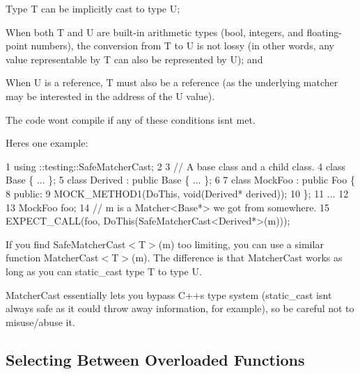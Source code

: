 \begin{DoxyEnumerate}
\item Type {\ttfamily T} can be implicitly cast to type {\ttfamily U};
\end{DoxyEnumerate}
\begin{DoxyEnumerate}
\item When both {\ttfamily T} and {\ttfamily U} are built-\/in arithmetic types ({\ttfamily bool}, integers, and floating-\/point numbers), the conversion from {\ttfamily T} to {\ttfamily U} is not lossy (in other words, any value representable by {\ttfamily T} can also be represented by {\ttfamily U}); and
\end{DoxyEnumerate}
\begin{DoxyEnumerate}
\item When {\ttfamily U} is a reference, {\ttfamily T} must also be a reference (as the underlying matcher may be interested in the address of the {\ttfamily U} value).
\end{DoxyEnumerate}

The code won\textquotesingle{}t compile if any of these conditions isn\textquotesingle{}t met.

Here\textquotesingle{}s one example\+:


\begin{DoxyCode}
1 using ::testing::SafeMatcherCast;
2 
3 // A base class and a child class.
4 class Base \{ ... \};
5 class Derived : public Base \{ ... \};
6 
7 class MockFoo : public Foo \{
8  public:
9   MOCK\_METHOD1(DoThis, void(Derived* derived));
10 \};
11 ...
12 
13   MockFoo foo;
14   // m is a Matcher<Base*> we got from somewhere.
15   EXPECT\_CALL(foo, DoThis(SafeMatcherCast<Derived*>(m)));
\end{DoxyCode}


If you find {\ttfamily Safe\+Matcher\+Cast$<$T$>$(m)} too limiting, you can use a similar function {\ttfamily Matcher\+Cast$<$T$>$(m)}. The difference is that {\ttfamily Matcher\+Cast} works as long as you can {\ttfamily static\+\_\+cast} type {\ttfamily T} to type {\ttfamily U}.

{\ttfamily Matcher\+Cast} essentially lets you bypass C++\textquotesingle{}s type system ({\ttfamily static\+\_\+cast} isn\textquotesingle{}t always safe as it could throw away information, for example), so be careful not to misuse/abuse it.

\subsection*{Selecting Between Overloaded Functions}

